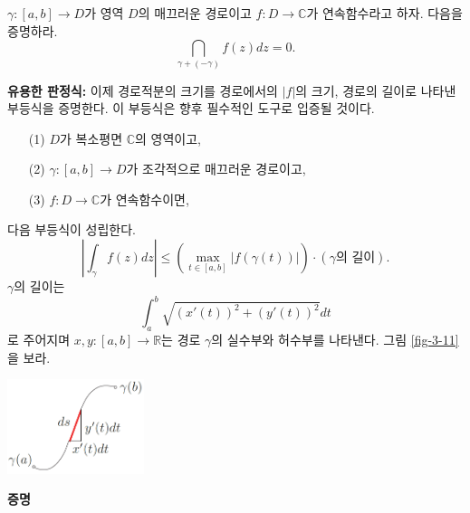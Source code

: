 \begin{salt_exercise} \label{ex-3-8}
$\gamma: [a,b] \to D$가 영역 $D$의 매끄러운 경로이고
$f:D\to\mathbb C$가 연속함수라고 하자. 다음을 증명하라.
\[
\dint_{\gamma+(-\gamma)} f(z)dz =0.
\]
\end{salt_exercise}

{\bf 유용한 판정식:}
이제 경로적분의 크기를 경로에서의 $|f|$의 크기, 경로의 길이로 
나타낸 부등식을 증명한다. 이 부등식은 향후 필수적인 도구로 입증될 것이다.

\begin{saltprop}{}{} \label{prop-3-4}
\begin{itemize}
\item[(1)] $D$가 복소평면 $\mathbb C$의 영역이고,
\item[(2)]  $\gamma : [a,b] \to D$가 조각적으로 매끄러운 경로이고,
\item[(3)] $f:D\to\mathbb C$가 연속함수이면,
\end{itemize}
다음 부등식이 성립한다.
\begin{equation} \label{eq-3-3}
\left| \int_\gamma f(z)dz \right| 
\le \left( \max_{t\in[a,b]} |f(\gamma(t))| \right) 
\cdot (\gamma \text{의 길이}).
\end{equation}
$\gamma$의 길이는 
\[
\int_a^b \sqrt{ (x'(t))^2 + (y'(t))^2} dt
\]
로 주어지며 $x,y: [a,b] \to \mathbb R$는
경로 $\gamma$의 실수부와 허수부를 나타낸다.
그림 \ref{fig-3-11}을 보라.
\begin{center}
\captionsetup{type=figure}
\includegraphics[width=0.3\textwidth]{./SaltChapter/figs/fig-3-11}
\label{fig-3-11}
\end{center}
\end{saltprop}

{\bf 증명}


